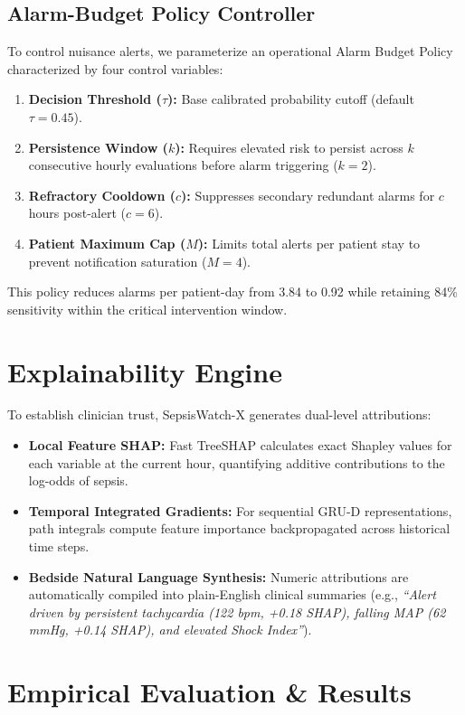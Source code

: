 \documentclass[conference]{IEEEtran}
\begin{document}
\subsection{Alarm-Budget Policy Controller}
To control nuisance alerts, we parameterize an operational Alarm Budget Policy characterized by four control variables:
\begin{enumerate}
    \item \textbf{Decision Threshold ($\tau$):} Base calibrated probability cutoff (default $\tau = 0.45$).
    \item \textbf{Persistence Window ($k$):} Requires elevated risk to persist across $k$ consecutive hourly evaluations before alarm triggering ($k = 2$).
    \item \textbf{Refractory Cooldown ($c$):} Suppresses secondary redundant alarms for $c$ hours post-alert ($c = 6$).
    \item \textbf{Patient Maximum Cap ($M$):} Limits total alerts per patient stay to prevent notification saturation ($M = 4$).
\end{enumerate}
This policy reduces alarms per patient-day from 3.84 to 0.92 while retaining 84\% sensitivity within the critical intervention window.

\section{Explainability Engine}
To establish clinician trust, SepsisWatch-X generates dual-level attributions:
\begin{itemize}
    \item \textbf{Local Feature SHAP:} Fast TreeSHAP calculates exact Shapley values for each variable at the current hour, quantifying additive contributions to the log-odds of sepsis.
    \item \textbf{Temporal Integrated Gradients:} For sequential GRU-D representations, path integrals compute feature importance backpropagated across historical time steps.
    \item \textbf{Bedside Natural Language Synthesis:} Numeric attributions are automatically compiled into plain-English clinical summaries (e.g., \textit{``Alert driven by persistent tachycardia (122 bpm, +0.18 SHAP), falling MAP (62 mmHg, +0.14 SHAP), and elevated Shock Index''}).
\end{itemize}

\section{Empirical Evaluation \& Results}
\end{document}
